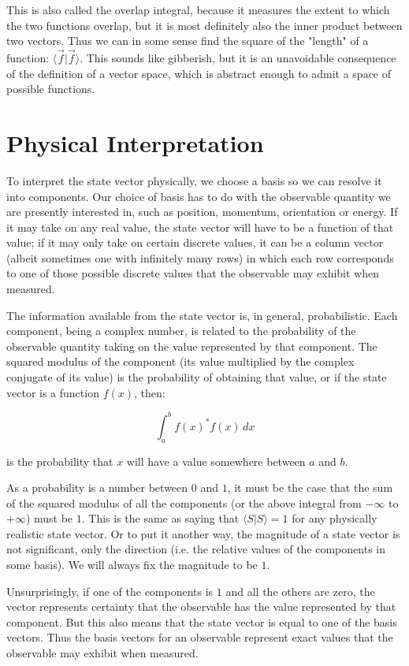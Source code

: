 This is also called the overlap integral, because it measures the extent to which the two functions overlap, but it is most definitely also the inner product between two vectors. Thus we can in some sense find the square of the "length" of a function: $\langle \vec{f} | \vec{f} \rangle$. This sounds like gibberish, but it is an unavoidable consequence of the definition of a vector space, which is abstract enough to admit a space of possible functions.

\section{Physical Interpretation}

To interpret the state vector physically, we choose a basis so we can resolve it into components. Our choice of basis has to do with the observable quantity we are presently interested in, such as position, momentum, orientation or energy. If it may take on any real value, the state vector will have to be a function of that value; if it may only take on certain discrete values, it can be a column vector (albeit sometimes one with infinitely many rows) in which each row corresponds to one of those possible discrete values that the observable may exhibit when measured.

The information available from the state vector is, in general, probabilistic. Each component, being a complex number, is related to the probability of the observable quantity taking on the value represented by that component. The squared modulus of the component (its value multiplied by the complex conjugate of its value) is the probability of obtaining that value, or if the state vector is a function $f(x)$, then:

$$\int_{a}^{b} f(x)^* f(x) \, dx$$

is the probability that $x$ will have a value somewhere between $a$ and $b$.

As a probability is a number between $0$ and $1$, it must be the case that the sum of the squared modulus of all the components (or the above integral from $-\infty$ to $+\infty$) must be $1$. This is the same as saying that $\langle S | S \rangle = 1$ for any physically realistic state vector. Or to put it another way, the magnitude of a state vector is not significant, only the direction (i.e. the relative values of the components in some basis). We will always fix the magnitude to be $1$.

Unsurprisingly, if one of the components is $1$ and all the others are zero, the vector represents certainty that the observable has the value represented by that component. But this also means that the state vector is equal to one of the basis vectors. Thus the basis vectors for an observable represent exact values that the observable may exhibit when measured.

